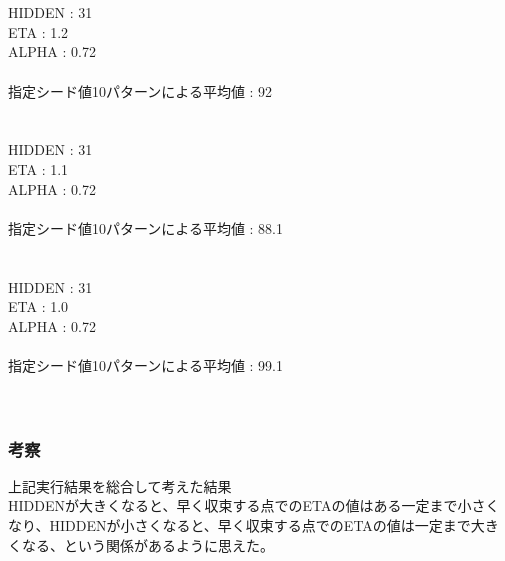 \\\\
HIDDEN : 31\\
ETA        : 1.2\\
ALPHA   : 0.72\\\\

指定シード値10パターンによる平均値 : 92\\


\\\\
HIDDEN : 31\\
ETA        : 1.1\\
ALPHA   : 0.72\\\\

指定シード値10パターンによる平均値 : 88.1\\


\\\\
HIDDEN : 31\\
ETA        : 1.0\\
ALPHA   : 0.72\\\\

指定シード値10パターンによる平均値 : 99.1\\
\\\\

\subsubsection{考察}
上記実行結果を総合して考えた結果\\
HIDDENが大きくなると、早く収束する点でのETAの値はある一定まで小さくなり、HIDDENが小さくなると、早く収束する点でのETAの値は一定まで大きくなる、という関係があるように思えた。





